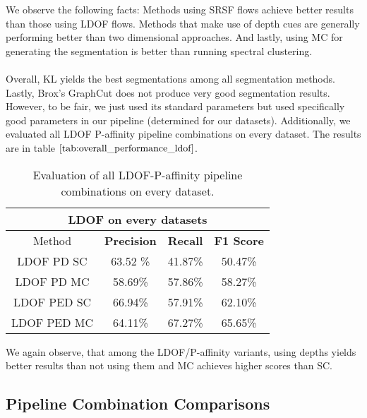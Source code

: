 We observe the following facts: Methods using SRSF flows achieve better results than those using LDOF flows. Methods that make use of depth cues are generally performing better than two dimensional approaches. And lastly, using MC for generating the segmentation is better than running spectral clustering. \\ \\
Overall, KL yields the best segmentations among all segmentation methods. Lastly, Brox's GraphCut does not produce very good segmentation results. However, to be fair, we just used its standard parameters but used specifically good parameters in our pipeline (determined for our datasets).
Additionally, we evaluated all LDOF P-affinity pipeline combinations on every dataset. The results are in table $\ref{tab:overall_performance_ldof}$.
\begin{table}[H]
\centering
\begin{tabular}{|c|c|c|c|}
\hline
\multicolumn{4}{|c|}{LDOF on every datasets}                        \\ \hline
Method & \textbf{Precision} & \textbf{Recall} & \textbf{F1 Score} \\ \hline
LDOF PD SC & 63.52 \%   & 41.87\%     & 50.47\%  \\ \hline
LDOF PD MC & 58.69\%   & 57.86\%     & 58.27\%  \\ \hline
LDOF PED SC & 66.94\%   & 57.91\%     & 62.10\%  \\ \hline
LDOF PED MC & 64.11\%   & 67.27\%     & 65.65\%  \\ \hline                 
\end{tabular}
\caption[Overall Performance LDOF P-Affinities]{Evaluation of all LDOF-P-affinity pipeline combinations on every dataset. }
\label{tab:overall_performance_ldof}
\end{table}
We again observe, that among the LDOF/P-affinity variants, using depths yields better results than not using them and MC achieves higher scores than SC.  

\subsection{Pipeline Combination Comparisons}

